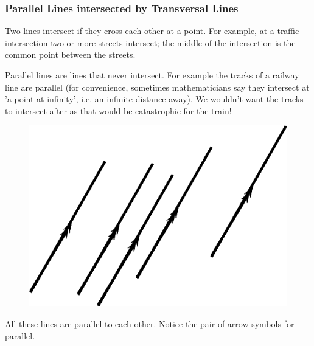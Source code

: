\subsubsection{ Parallel Lines intersected by Transversal Lines}
Two lines intersect if they cross each other at a point. For example, at a
traffic intersection two or more streets intersect; the middle of the
intersection is the common point between the streets.\par 
Parallel lines are lines that never intersect. For example the tracks of a
railway line are parallel (for convenience, sometimes mathematicians say they
intersect at 'a point at infinity', i.e. an infinite distance away). We wouldn't
want the tracks to intersect after as that would be catastrophic for the
train!\par 

\setcounter{subfigure}{0}
\begin{figure}[H] %
\begin{center}
\label{m39370*id316228!!!underscore!!!media}\label{
m39370*id316228!!!underscore!!!printimage}\includegraphics{
col11306.imgs/m39370_MG10C13_010.png} %
\vspace{2pt}
\vspace{.1in}
\end{center}
\end{figure}       
\par 
All these lines are parallel to each other. Notice the pair of arrow symbols for
parallel.\par 


